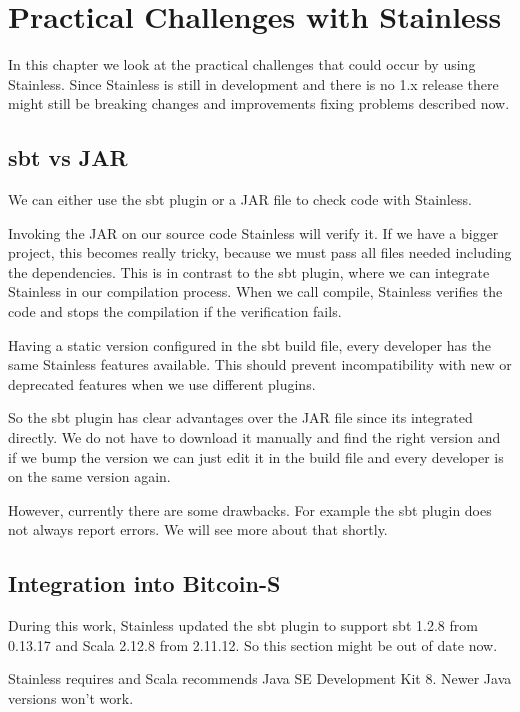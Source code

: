\chapter{Practical Challenges with Stainless}
\label{chap:appendix_arb}

In this chapter we look at the practical challenges that could occur by using Stainless.
Since Stainless is still in development and there is no 1.x release there might still be breaking changes and improvements fixing problems described now.


\section{sbt vs JAR}

We can either use the sbt plugin or a JAR file to check code with Stainless.

Invoking the JAR on our source code Stainless will verify it.
If we have a bigger project, this becomes really tricky, because we must pass all files needed including the dependencies.
This is in contrast to the sbt plugin, where we can integrate Stainless in our compilation process.
When we call compile, Stainless verifies the code and stops the compilation if the verification fails.

Having a static version configured in the sbt build file, every developer has the same Stainless features available.
This should prevent incompatibility with new or deprecated features when we use different plugins.

So the sbt plugin has clear advantages over the JAR file since its integrated directly.
We do not have to download it manually and find the right version and if we bump the version we can just edit it in the build file and every developer is on the same version again.

However, currently there are some drawbacks.
For example the sbt plugin does not always report errors.
We will see more about that shortly.


\section{Integration into Bitcoin-S}

During this work, Stainless updated the sbt plugin to support sbt 1.2.8 from 0.13.17 and Scala 2.12.8 from 2.11.12.
So this section might be out of date now.

Stainless requires and Scala recommends Java SE Development Kit 8.
Newer Java versions won't work.

